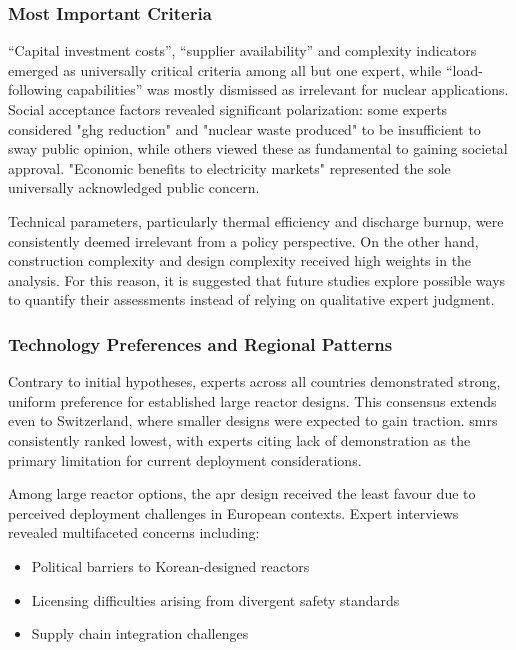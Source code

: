 \subsubsection{Most Important Criteria}
“Capital investment costs”, “supplier availability” and complexity indicators emerged as universally critical criteria among all but one expert, while “load-following capabilities” was mostly dismissed as irrelevant for nuclear applications. Social acceptance factors revealed significant polarization: some experts considered "\gls{ghg} reduction" and "nuclear waste produced" to be insufficient to sway public opinion, while others viewed these as fundamental to gaining societal approval. "Economic benefits to electricity markets" represented the sole universally acknowledged public concern.

Technical parameters, particularly thermal efficiency and discharge burnup, were consistently deemed irrelevant from a policy perspective. On the other hand, construction complexity and design complexity received high weights in the analysis. For this reason, it is suggested that future studies explore possible ways to quantify their assessments instead of relying on qualitative expert judgment.

\subsubsection{Technology Preferences and Regional Patterns}

Contrary to initial hypotheses, experts across all countries demonstrated strong, uniform preference for established large reactor designs. This consensus extends even to Switzerland, where smaller designs were expected to gain traction. \glspl{smr} consistently ranked lowest, with experts citing lack of demonstration as the primary limitation for current deployment considerations.

Among large reactor options, the \gls{apr} design received the least favour due to perceived deployment challenges in European contexts. Expert interviews revealed multifaceted concerns including:
\begin{itemize}
    \item Political barriers to Korean-designed reactors
    \item Licensing difficulties arising from divergent safety standards
    \item Supply chain integration challenges
\end{itemize}

